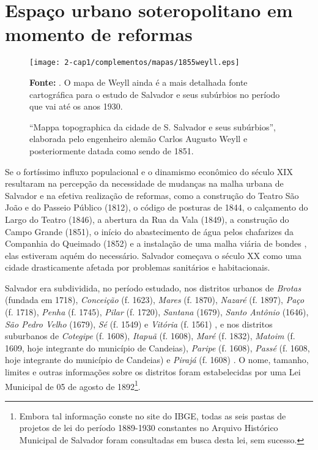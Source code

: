 \section{Espaço urbano soteropolitano em momento de reformas}\label{sec:1.4}

\begin{landscape}
\begin{figure}[!htp]
\centering
\texttt{[image: 2-cap1/complementos/mapas/1855weyll.eps]}{\footnotesize \par \textbf{Fonte:} . O mapa de Weyll ainda é a mais detalhada fonte cartográfica para o estudo de Salvador e seus subúrbios no período que vai até os anos 1930. \par} 
\caption{``Mappa topographica da cidade de S. Salvador e seus subúrbios'', elaborada pelo engenheiro alemão Carlos Augusto Weyll e posteriormente datada como sendo de 1851.  }
\end{figure}
\end{landscape}

Se o fortíssimo influxo populacional e o dinamismo econômico do século XIX resultaram na percepção da necessidade de mudanças na malha urbana de Salvador e na efetiva realização de reformas, como a construção do Teatro São João e do Passeio Público (1812), o código de posturas de 1844, o calçamento do Largo do Teatro (1846), a abertura da Rua da Vala (1849), a construção do Campo Grande (1851), o início do abastecimento de água pelos chafarizes da Companhia do Queimado (1852) e a instalação de uma malha viária de bondes \cite{fernandesgomes1992, fernandessampaiogomes1999, NASCIMENTO2007, sampaio_50_2005}, elas estiveram aquém do necessário. Salvador começava o século XX como uma cidade drasticamente afetada por problemas sanitários e habitacionais.

Salvador era subdividida, no período estudado, nos distritos urbanos de \textit{Brotas} (fundada em 1718), \textit{Conceição} (f. 1623), \textit{Mares} (f. 1870), \textit{Nazaré} (f. 1897), \textit{Paço} (f. 1718), \textit{Penha} (f. 1745), \textit{Pilar} (f. 1720), \textit{Santana} (1679), \textit{Santo Antônio }(1646), \textit{São Pedro Velho} (1679), \textit{Sé} (f. 1549) e \textit{Vitória} (f. 1561) \cite[259-307]{VASCONCELOS2002}, e nos distritos suburbanos de \textit{Cotegipe} (f. 1608), \textit{Itapuã} (f. 1608), \textit{Maré} (f. 1832), \textit{Matoim} (f. 1609, hoje integrante do município de Candeias), \textit{Paripe} (f. 1608), \textit{Passé} (f. 1608, hoje integrante do município de Candeias) e \textit{Pirajá} (f. 1608) \cite[p.~53-62]{NASCIMENTO2007}. O nome, tamanho, limites e outras informações sobre os distritos foram estabelecidas por uma Lei Municipal de 05 de agosto de 1892\footnote{Embora tal informação conste no site do IBGE, todas as seis pastas de projetos de lei do período 1889-1930 constantes no Arquivo Histórico Municipal de Salvador foram consultadas em busca desta lei, sem sucesso.}.

